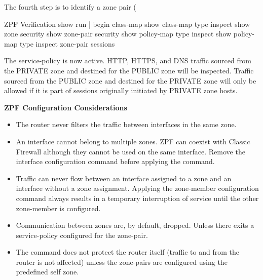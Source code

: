 The fourth step is to identify a zone pair (\\

\begin{sexylisting}{ZPF Verification}
show run | begin class-map
show class-map type inspect
show zone security
show zone-pair security
show policy-map type inspect
show policy-map type inspect zone-pair sessions
\end{sexylisting}

The service-policy is now active. HTTP, HTTPS, and DNS traffic sourced from the PRIVATE zone and destined for the PUBLIC zone will be inspected. Traffic sourced from the PUBLIC zone and destined for the PRIVATE zone will only be allowed if it is part of sessions originally initiated by PRIVATE zone hosts.

\textbf{ZPF Configuration Considerations}

\begin{itemize}
\item The router never filters the traffic between interfaces in the same zone.
\item An interface cannot belong to multiple zones.
ZPF can coexist with Classic Firewall although they cannot be used on the same interface. Remove the  interface configuration command before applying the  command.
\item Traffic can never flow between an interface assigned to a zone and an interface without a zone assignment. Applying the zone-member configuration command always results in a temporary interruption of service until the other zone-member is configured.
\item Communication between zones are, by default, dropped. Unless there exits a service-policy configured for the zone-pair.
\item The  command does not protect the router itself (traffic to and from the router is not affected) unless the zone-pairs are configured using the predefined self zone.
\end{itemize}